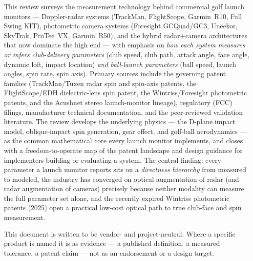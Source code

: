 \noindent
This review surveys the measurement technology behind commercial golf launch
monitors --- Doppler-radar systems (TrackMan, FlightScope, Garmin~R10, Full
Swing KIT), photometric camera systems (Foresight GCQuad/GC3, Uneekor,
SkyTrak, ProTee~VX, Garmin~R50), and the hybrid radar+camera architectures
that now dominate the high end --- with emphasis on \emph{how each system
measures or infers club-delivery parameters} (club speed, club path, attack
angle, face angle, dynamic loft, impact location) \emph{and ball-launch
parameters} (ball speed, launch angles, spin rate, spin axis). Primary
sources include the governing patent families (TrackMan/Tuxen radar spin and
spin-axis patents, the FlightScope/EDH dielectric-lens spin patent, the
Wintriss/Foresight photometric patents, and the Acushnet stereo
launch-monitor lineage), regulatory (FCC) filings, manufacturer technical
documentation, and the peer-reviewed validation literature. The review
develops the underlying physics --- the D-plane impact model, oblique-impact
spin generation, gear effect, and golf-ball aerodynamics --- as the common
mathematical core every launch monitor implements, and closes with a
freedom-to-operate map of the patent landscape and design guidance for
implementers building or evaluating a system. The central finding: every
parameter a launch monitor reports sits on a \emph{directness hierarchy}
from measured to modeled, the industry has converged on optical augmentation
of radar (and radar augmentation of cameras) precisely because neither
modality can measure the full parameter set alone, and the recently expired
Wintriss photometric patents (2025) open a practical low-cost optical path
to true club-face and spin measurement.

This document is written to be vendor- and project-neutral. Where a
specific product is named it is as evidence --- a published definition, a
measured tolerance, a patent claim --- not as an endorsement or a design
target.
